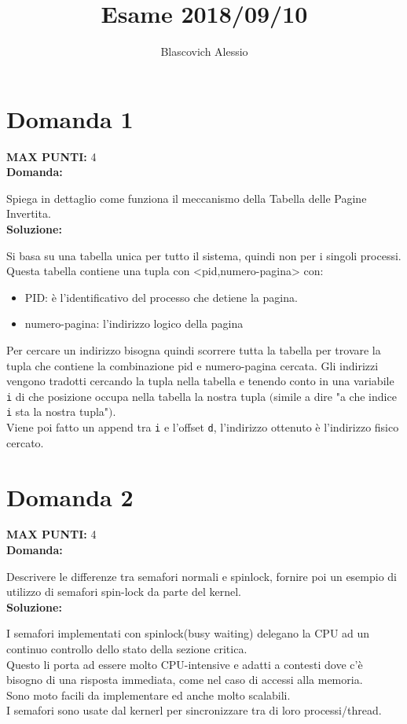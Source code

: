 \documentclass{article}
\title{Esame 2018/09/10}
\author{Blascovich Alessio}
\date{}
\begin{document}
    \maketitle
    \section*{Domanda 1}
    \textbf{MAX PUNTI:} 4\\
    \textbf{Domanda:}


    Spiega in dettaglio come funziona il meccanismo della Tabella delle Pagine Invertita.\\
    \textbf{Soluzione:}


    Si basa su una tabella unica per tutto il sistema, quindi non per i singoli processi.\\
    Questa tabella contiene una tupla con <pid,numero-pagina> con:
    \begin{itemize}
        \item PID: è l'identificativo del processo che detiene la pagina.
        \item numero-pagina: l'indirizzo logico della pagina
    \end{itemize}
    Per cercare un indirizzo bisogna quindi scorrere tutta la tabella per trovare la tupla che contiene la combinazione pid e numero-pagina cercata.
    Gli indirizzi vengono tradotti cercando la tupla nella tabella e tenendo conto in una variabile \verb+i+ di che posizione occupa nella tabella la nostra tupla $($simile a dire "a che indice \verb+i+ sta la nostra tupla"$)$.\\
    Viene poi fatto un append tra \verb+i+ e l'offset \verb+d+, l'indirizzo ottenuto è l'indirizzo fisico cercato.
    \section*{Domanda 2}
    \textbf{MAX PUNTI:} 4\\
    \textbf{Domanda:}


    Descrivere le differenze tra semafori normali e spinlock, fornire poi un esempio di utilizzo di semafori spin-lock da parte del kernel.\\
    \textbf{Soluzione:}


    I semafori implementati con spinlock(busy waiting) delegano la CPU ad un continuo controllo dello stato della sezione critica.\\
    Questo li porta ad essere molto CPU-intensive e adatti a contesti dove c'è bisogno di una risposta immediata, come nel caso di accessi alla memoria.\\
    Sono moto facili da implementare ed anche molto scalabili.\\
    I semafori sono usate dal kernerl per sincronizzare tra di loro processi/thread.
\end{document}
